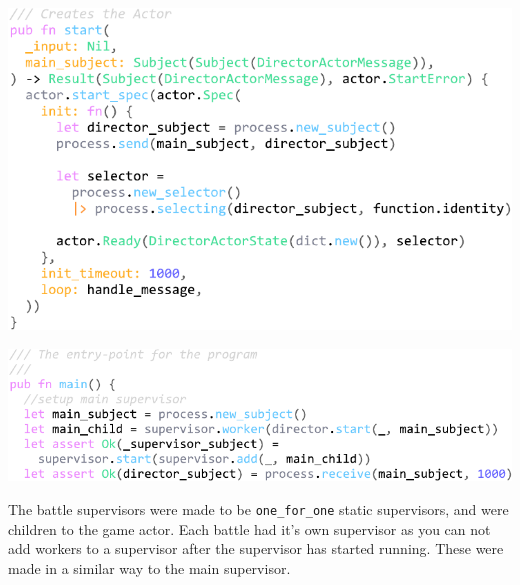 \documentclass[]{final}
\begin{document}
\begin{minipage}[t]{18em}
  \includegraphics[width=\linewidth]{director_start.pdf}
  \label{fig: 18}
\end{minipage}
\hfill
\begin{minipage}[t]{20em}
  \includegraphics[width=\linewidth]{main_supervisor.pdf}
  \label{fig: 19}
\end{minipage}

The battle supervisors were made to be \lstinline|one_for_one| static
supervisors, and were children to the game actor. Each battle had it's own
supervisor as you can not add workers to a supervisor after the supervisor
has started running. These were made in a similar way to the main supervisor.
\end{document}
